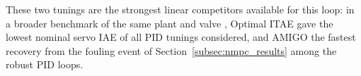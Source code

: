 These two tunings are the strongest linear competitors available for this loop: in a broader benchmark of the same plant and valve \cite{andrade2026robust}, Optimal ITAE gave the lowest nominal servo IAE of all PID tunings considered, and AMIGO the fastest recovery from the fouling event of Section~\ref{subsec:nmpc_results} among the robust PID loops.
